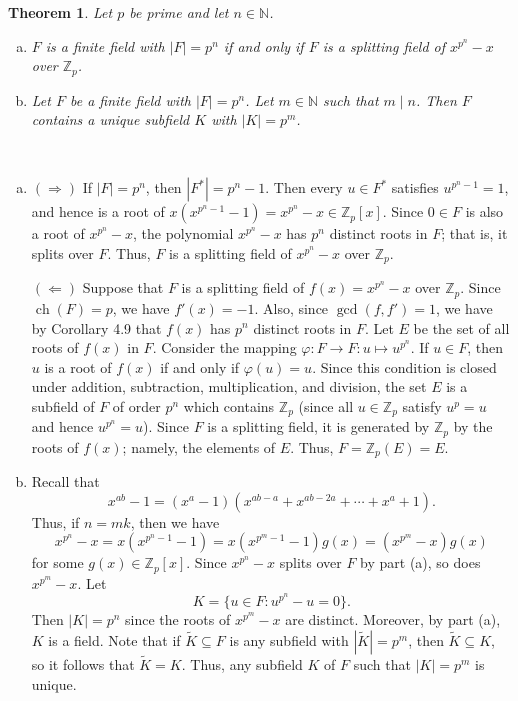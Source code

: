 \documentclass[10pt]{article}
\makeatletter
\newcommand{\N}{\mathbb{N}}
\newcommand{\Z}{\mathbb{Z}}
\DeclareMathOperator{\ch}{ch}
\theoremstyle{newstyle}
\newtheorem{thm}{Theorem}[section]
\newenvironment{pf}[1][\proofname]{\par
  \pushQED{\qed}%
  \normalfont \topsep0\p@\relax
  \trivlist
  \item[\hskip\labelsep\scshape
  #1\@addpunct{.}]\ignorespaces
}{%
  \popQED\endtrivlist\@endpefalse
}
\makeatother
\begin{document}
\begin{thm}
Let $p$ be prime and let $n \in \N$. 
\begin{enumerate}[(a)]
    \item $F$ is a finite field with $|F| = p^n$ if and only if $F$ is a splitting field 
    of $x^{p^n} - x$ over $\Z_p$. 
    \item Let $F$ be a finite field with $|F| = p^n$. Let $m \in \N$ such that 
    $m \mid n$. Then $F$ contains a unique subfield $K$ with $|K| = p^m$.
\end{enumerate}
\end{thm}
\begin{pf}~
\begin{enumerate}[(a)]
    \item $(\Rightarrow)$ If $|F| = p^n$, then $|F^*| = p^n - 1$. Then every $u \in F^*$ satisfies 
    $u^{p^n-1} = 1$, and hence is a root of $x(x^{p^n-1}-1) = x^{p^n} - x \in \Z_p[x]$. 
    Since $0 \in F$ is also a root of $x^{p^n} - x$, the polynomial $x^{p^n} - x$ 
    has $p^n$ distinct roots in $F$; that is, it splits over $F$. Thus, $F$ 
    is a splitting field of $x^{p^n} - x$ over $\Z_p$. 
    
    $(\Leftarrow)$ Suppose that $F$ is a splitting field of $f(x) = x^{p^n} - x$ over $\Z_p$. 
    Since $\ch(F) = p$, we have $f'(x) = -1$. Also, since $\gcd(f, f') = 1$, we have by 
    Corollary 4.9 that $f(x)$ has $p^n$ distinct roots in $F$. Let $E$ be the 
    set of all roots of $f(x)$ in $F$. Consider the mapping $\varphi : F \to F : u \mapsto u^{p^n}$. 
    If $u \in F$, then $u$ is a root of $f(x)$ if and only if $\varphi(u) = u$. 
    Since this condition is closed under addition, subtraction, multiplication, and 
    division, the set $E$ is a subfield of $F$ of order $p^n$ which contains $\Z_p$ 
    (since all $u \in \Z_p$ satisfy $u^p = u$ and hence $u^{p^n} = u$). Since $F$ is a 
    splitting field, it is generated by $\Z_p$ by the roots of $f(x)$; namely, the 
    elements of $E$. Thus, $F = \Z_p(E) = E$. 
    
    \item Recall that 
    \[ x^{ab} - 1 = (x^a - 1)(x^{ab-a} + x^{ab-2a} + \cdots + x^a + 1). \]
    Thus, if $n = mk$, then we have 
    \[ x^{p^n} - x = x(x^{p^n-1}-1) = x(x^{p^m-1}-1)g(x) = (x^{p^m}-x)g(x) \]
    for some $g(x) \in \Z_p[x]$. Since $x^{p^n}-x$ splits over $F$ by part (a), so does 
    $x^{p^m}-x$. Let 
    \[ K = \{u \in F : u^{p^n} - u = 0\}. \]
    Then $|K| = p^n$ since the roots of $x^{p^m} - x$ are distinct. Moreover, by part (a), 
    $K$ is a field. Note that if $\widetilde{K} \subseteq F$ is any subfield with 
    $|\widetilde{K}| = p^m$, then $\widetilde{K} \subseteq K$, so it follows that 
    $\widetilde{K} = K$. Thus, any subfield $K$ of $F$ such that $|K| = p^m$ is unique. \qedhere 
\end{enumerate}
\end{pf}
\end{document}
